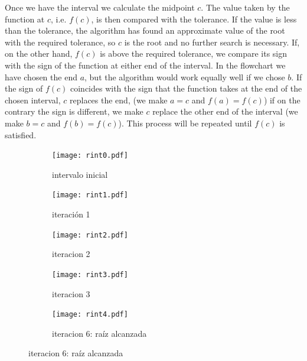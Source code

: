 \begin{paracol}{2}
\switchcolumn

 Once we have the interval we calculate the midpoint $c$. The value taken by the function at $c$, i.e. $f(c)$, is then compared with the tolerance. If the value is less than the tolerance, the algorithm has found an approximate value of the root with the required tolerance, so $c$ is the root and no further search is necessary. If, on the other hand, $f(c)$ is above the required tolerance, we compare its sign with the sign of the function at either end of the interval. In the flowchart we have chosen the end $a$, but the algorithm would work equally well if we chose $b$. If the sign of $f(c)$ coincides with the sign that the function takes at the end of the chosen interval, $c$ replaces the end, (we make $a=c$ and $f(a)=f(c)$) if on the contrary the sign is different, we make $c$ replace the other end of the interval (we make $b=c$ and $f(b)=f(c)$). This process will be repeated until $f(c)$ is satisfied. 


\end{paracol} 

\begin{figure}
\centering
\begin{subfigure}{0.4\textwidth}
	{\texttt{[image: rint0.pdf]}}
	\caption{intervalo inicial}
\end{subfigure}
\begin{subfigure}{0.4\textwidth}
	{\texttt{[image: rint1.pdf]}}
	\caption{iteración 1}
\end{subfigure}	
\begin{subfigure}{0.4\textwidth}
	{\texttt{[image: rint2.pdf]}}
	\caption{iteracion 2}
\end{subfigure}
\begin{subfigure}{0.4\textwidth}
	{\texttt{[image: rint3.pdf]}}
	\caption{iteracion 3}
\end{subfigure}
\begin{subfigure}{0.4\textwidth}
	{\texttt{[image: rint4.pdf]}}
    \caption{iteracion 6: raíz alcanzada}
\end{subfigure}
\label{fig:bisec}
\end{figure}

